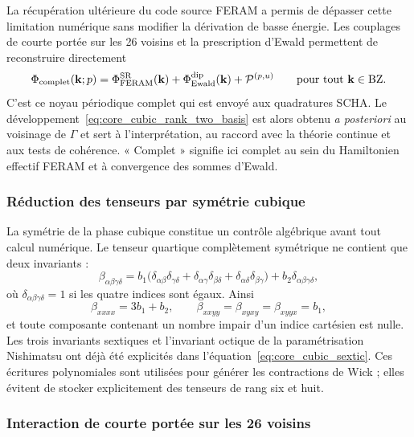 La récupération ultérieure du code source FERAM a permis de dépasser cette
limitation numérique sans modifier la dérivation de basse énergie. Les
couplages de courte portée sur les 26 voisins et la prescription d'Ewald
permettent de reconstruire directement
\begin{equation}
\Phi_{\rm complet}(\mathbf k;p)
=\Phi^{\rm SR}_{\rm FERAM}(\mathbf k)
+\Phi^{\rm dip}_{\rm Ewald}(\mathbf k)
+\mathcal P^{(p,u)}
\qquad \text{pour tout $\mathbf k\in\mathrm{BZ}$}.
\label{eq:core_full_kernel_hierarchy}
\end{equation}
C'est ce noyau périodique complet qui est envoyé aux quadratures SCHA. Le
développement~\eqref{eq:core_cubic_rank_two_basis} est alors obtenu
\emph{a posteriori} au voisinage de $\Gamma$ et sert à l'interprétation, au
raccord avec la théorie continue et aux tests de cohérence. « Complet » signifie
ici complet au sein du Hamiltonien effectif FERAM et à convergence des sommes
d'Ewald.

\subsubsection{Réduction des tenseurs par symétrie cubique}

La symétrie de la phase cubique constitue un contrôle algébrique avant tout
calcul numérique. Le tenseur quartique complètement symétrique ne contient que
deux invariants :
\begin{equation}
\beta_{\alpha\beta\gamma\delta}
=b_1\big(
\delta_{\alpha\beta}\delta_{\gamma\delta}
+\delta_{\alpha\gamma}\delta_{\beta\delta}
+\delta_{\alpha\delta}\delta_{\beta\gamma}\big)
+b_2\delta_{\alpha\beta\gamma\delta},
\label{eq:core_cubic_quartic}
\end{equation}
où $\delta_{\alpha\beta\gamma\delta}=1$ si les quatre indices sont égaux.
Ainsi
\begin{equation}
\beta_{xxxx}=3b_1+b_2,\qquad
\beta_{xxyy}=\beta_{xyxy}=\beta_{xyyx}=b_1,
\label{eq:core_quartic_components}
\end{equation}
et toute composante contenant un nombre impair d'un indice cartésien est
nulle. Les trois invariants sextiques et l'invariant octique de la
paramétrisation Nishimatsu ont déjà été explicités dans
l'équation~\eqref{eq:core_cubic_sextic}. Ces écritures polynomiales sont
utilisées pour générer les contractions de Wick ; elles évitent de stocker
explicitement des tenseurs de rang six et huit.

\subsubsection{Interaction de courte portée sur les 26 voisins}

